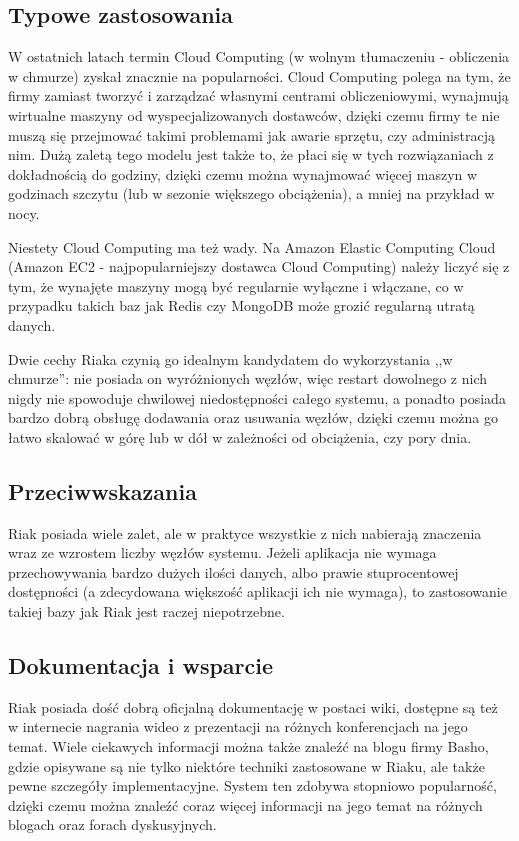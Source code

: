\subsection*{Typowe zastosowania}

W ostatnich latach termin Cloud Computing (w wolnym tłumaczeniu - obliczenia w chmurze) zyskał znacznie na popularności.
Cloud Computing polega na tym, że firmy zamiast tworzyć i zarządzać własnymi centrami obliczeniowymi, wynajmują wirtualne maszyny od wyspecjalizowanych dostawców, dzięki czemu firmy te nie muszą się przejmować takimi problemami jak awarie sprzętu, czy administracją nim.
Dużą zaletą tego modelu jest także to, że płaci się w tych rozwiązaniach z dokładnością do godziny, dzięki czemu można wynajmować więcej maszyn w godzinach szczytu (lub w sezonie większego obciążenia), a mniej na przykład w nocy.

Niestety Cloud Computing ma też wady.
Na Amazon Elastic Computing Cloud (Amazon EC2 - najpopularniejszy dostawca Cloud Computing) należy liczyć się z tym, że wynajęte maszyny mogą być regularnie wyłączne i włączane, co w przypadku takich baz jak Redis czy MongoDB może grozić regularną utratą danych.

Dwie cechy Riaka czynią go idealnym kandydatem do wykorzystania ,,w chmurze'': nie posiada on wyróżnionych węzłów, więc restart dowolnego z nich nigdy nie spowoduje chwilowej niedostępności całego systemu, a ponadto posiada bardzo dobrą obsługę dodawania oraz usuwania węzłów, dzięki czemu można go łatwo skalować w górę lub w dół w zależności od obciążenia, czy pory dnia.

\subsection*{Przeciwwskazania}

Riak posiada wiele zalet, ale w praktyce wszystkie z nich nabierają znaczenia wraz ze wzrostem liczby węzłów systemu.
Jeżeli aplikacja nie wymaga przechowywania bardzo dużych ilości danych, albo prawie stuprocentowej dostępności (a zdecydowana większość aplikacji ich nie wymaga), to zastosowanie takiej bazy jak Riak jest raczej niepotrzebne.

\subsection*{Dokumentacja i wsparcie}

Riak posiada dość dobrą oficjalną dokumentację w postaci wiki, dostępne są też w internecie nagrania wideo z prezentacji na różnych konferencjach na jego temat.
Wiele ciekawych informacji można także znaleźć na blogu firmy Basho, gdzie opisywane są nie tylko niektóre techniki zastosowane w Riaku, ale także pewne szczegóły implementacyjne.
System ten zdobywa stopniowo popularność, dzięki czemu można znaleźć coraz więcej informacji na jego temat na różnych blogach oraz forach dyskusyjnych.

